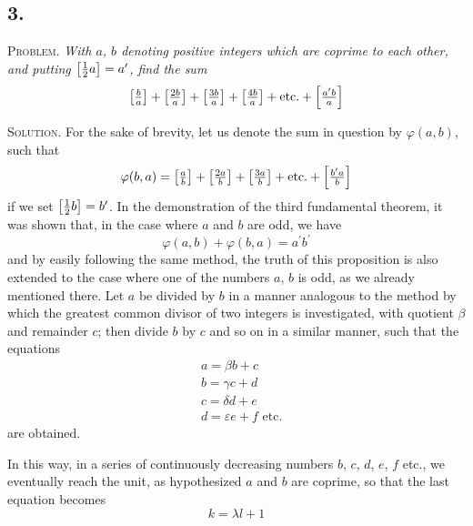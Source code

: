 \documentclass[twoside,12pt, showframe]{memoir}
\let\oldfrac\frac
\def\frac#1#2{\mathchoice{\tfrac{#1}{#2}}{\oldfrac{#1}{#2}}{\genfrac{}{}{}{2}{#1}{#2\mathstrut}}{\genfrac{}{}{}{3}{#1}{#2\mathstrut}}}
\begin{document}
\subsection*{3.}
 
\textsc{Problem.} \textit{With \(a\), \(b\) denoting positive integers which are coprime to each other, and putting \(\left[\frac{1}{2} a\right]=a^{\prime}\), find the sum}
\[\left[\frac{b}{a}\right]+\left[\frac{2 b}{a}\right]+\left[\frac{3 b}{a}\right]+\left[\frac{4 b}{a}\right]+\text{etc.}+\left[\frac{a^{\prime} b}{a}\right]\]
 
\textsc{Solution.} For the sake of brevity, let us denote the sum in question by \(\varphi(a, b)\), such that
\[\varphi(b, a)=\left[\frac{a}{b}\right]+\left[\frac{2 a}{b}\right]+\left[\frac{3 a}{b}\right]+\text{etc.}+\left[\frac{b^{\prime} a}{b}\right]\]
if we set \(\left[\frac{1}{2} b\right]=b^{\prime}\). In the demonstration of the third fundamental theorem, it was shown that, in the case where \(a\) and \(b\) are odd, we have
\[\varphi(a, b)+\varphi(b, a)=a^{\prime} b^{\prime}\]
and by easily following the same method, the truth of this proposition is also extended to the case where one of the numbers \(a\), \(b\) is odd, as we already mentioned there. Let \(a\) be divided by \(b\) in a manner analogous to the method by which the greatest common divisor of two integers is investigated, with quotient \(\beta\) and remainder \(c\); then divide \(b\) by \(c\) and so on in a similar manner, such that the equations
\[\begin{aligned}
& a=\beta b+c \\
& b=\gamma c+d \\
& c=\delta d+e \\
& d=\varepsilon e+f \text{ etc.}
\end{aligned}\]
are obtained.
 
In this way, in a series of continuously decreasing numbers \(b\), \(c\), \(d\), \(e\), \(f\) etc., we eventually reach the unit, as hypothesized \(a\) and \(b\) are coprime, so that the last equation becomes
\[k=\lambda l+1\]
%
\end{document}
